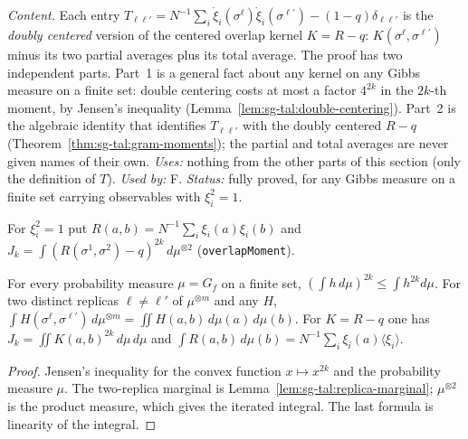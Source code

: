 \emph{Content.}  Each entry $T_{\ell\ell'}=N^{-1}\sum_i\dot\xi_i(\sigma^\ell)\dot\xi_i(\sigma^{\ell'})-(1-q)\delta_{\ell\ell'}$ is the \emph{doubly centered} version of the centered overlap kernel $K=R-q$: $K(\sigma^\ell,\sigma^{\ell'})$ minus its two partial averages plus its total average.
The proof has two independent parts.  Part~1 is a general fact about any kernel on any Gibbs measure on a finite set: double centering costs at most a factor $4^{2k}$ in the $2k$-th moment, by Jensen's inequality (Lemma~\ref{lem:sg-tal:double-centering}).  Part~2 is the algebraic identity that identifies $T_{\ell\ell'}$ with the doubly centered $R-q$ (Theorem~\ref{thm:sg-tal:gram-moments}); the partial and total averages are never given names of their own.
\emph{Uses:} nothing from the other parts of this section (only the definition of $T$).  \emph{Used by:} F.  \emph{Status:} fully proved, for any Gibbs measure on a finite set carrying observables with $\xi_i^2=1$.

\begin{definition}
\label{def:sg-tal:gibbs-overlap}
  \leanok
{}
For $\xi_i^2=1$ put $R(a,b)=N^{-1}\sum_i\xi_i(a)\xi_i(b)$ and $J_k=\int(R(\sigma^1,\sigma^2)-q)^{2k}\,d\mu^{\otimes2}$ (\texttt{overlapMoment}).
\end{definition}

\begin{lemma}
\label{lem:sg-tal:gibbs-jensen}
  \leanok
{}
For every probability measure $\mu=G_f$ on a finite set, $(\int h\,d\mu)^{2k}\le\int h^{2k}d\mu$.  For two distinct replicas $\ell\ne\ell'$ of $\mu^{\otimes m}$ and any $H$, $\int H(\sigma^\ell,\sigma^{\ell'})\,d\mu^{\otimes m}=\iint H(a,b)\,d\mu(a)\,d\mu(b)$.  For $K=R-q$ one has $J_k=\iint K(a,b)^{2k}\,d\mu\,d\mu$ and $\int R(a,b)\,d\mu(b)=N^{-1}\sum_i\xi_i(a)\langle\xi_i\rangle$.
\end{lemma}
\begin{proof}
  \leanok
Jensen's inequality for the convex function $x\mapsto x^{2k}$ and the probability measure $\mu$.  The two-replica marginal is Lemma~\ref{lem:sg-tal:replica-marginal}; $\mu^{\otimes2}$ is the product measure, which gives the iterated integral.  The last formula is linearity of the integral.
\end{proof}

